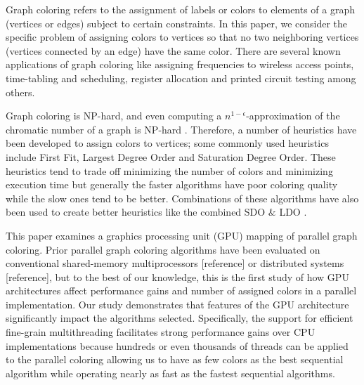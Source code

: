 \documentclass[preprint]{sigplanconf}
\begin{document}
Graph coloring refers to the assignment of labels or colors to elements of a graph (vertices or edges) subject to certain constraints. In this paper, we consider the specific problem of assigning colors to vertices so that no two neighboring vertices (vertices connected by an edge) have the same color.  There are several known applications of graph coloring like assigning frequencies to wireless access points, time-tabling and scheduling, register allocation and printed circuit testing among others.

Graph coloring is NP-hard, and even computing a $n^{1-\epsilon}$-approximation of the chromatic number of a graph is NP-hard \cite{zuckerman07}. Therefore, a number of heuristics have been developed to assign colors to vertices; some commonly used heuristics include First Fit\cite{}, Largest Degree Order\cite{} and Saturation Degree Order\cite{}.  These heuristics tend to trade off minimizing the number of colors and minimizing execution time but generally the faster algorithms have poor coloring quality while the slow ones tend to be better. Combinations of these algorithms have also been used to create better heuristics like the combined SDO $\&$ LDO \cite{}.

This paper examines a graphics processing unit (GPU) mapping of parallel graph coloring.  Prior parallel graph coloring algorithms have been evaluated on conventional shared-memory multiprocessors [reference] or distributed systems [reference], but to the best of our knowledge, this is the first study of how GPU architectures affect performance gains and number of assigned colors in a parallel implementation.  Our study demonstrates that features of the GPU architecture significantly impact the algorithms selected. Specifically, the support for efficient fine-grain multithreading facilitates strong performance gains over CPU implementations because hundreds or even thousands of threads can be applied to the parallel coloring allowing us to have as few colors as the best sequential algorithm while operating nearly as fast as the fastest sequential algorithms. 

\end{document}
